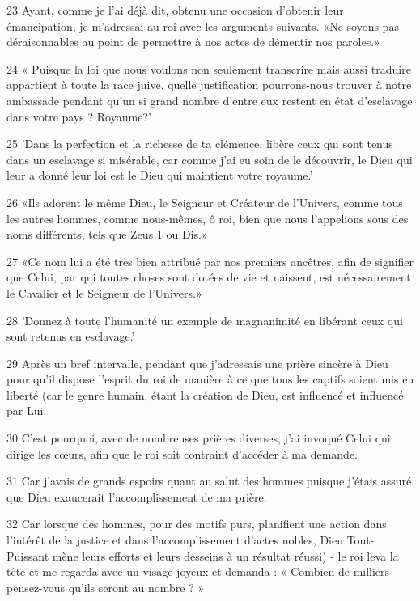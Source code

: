 \par 23 Ayant, comme je l'ai déjà dit, obtenu une occasion d'obtenir leur émancipation, je m'adressai au roi avec les arguments suivants. «Ne soyons pas déraisonnables au point de permettre à nos actes de démentir nos paroles.»

\par 24 « Puisque la loi que nous voulons non seulement transcrire mais aussi traduire appartient à toute la race juive, quelle justification pourrons-nous trouver à notre ambassade pendant qu'un si grand nombre d'entre eux restent en état d'esclavage dans votre pays ? Royaume?'

\par 25 'Dans la perfection et la richesse de ta clémence, libère ceux qui sont tenus dans un esclavage si misérable, car comme j'ai eu soin de le découvrir, le Dieu qui leur a donné leur loi est le Dieu qui maintient votre royaume.'

\par 26 «Ils adorent le même Dieu, le Seigneur et Créateur de l'Univers, comme tous les autres hommes, comme nous-mêmes, ô roi, bien que nous l'appelions sous des noms différents, tels que Zeus 1 ou Dis.»

\par 27 «Ce nom lui a été très bien attribué par nos premiers ancêtres, afin de signifier que Celui, par qui toutes choses sont dotées de vie et naissent, est nécessairement le Cavalier et le Seigneur de l'Univers.»

\par 28 'Donnez à toute l'humanité un exemple de magnanimité en libérant ceux qui sont retenus en esclavage.'

\par 29 Après un bref intervalle, pendant que j'adressais une prière sincère à Dieu pour qu'il dispose l'esprit du roi de manière à ce que tous les captifs soient mis en liberté (car le genre humain, étant la création de Dieu, est influencé et influencé par Lui.

\par 30 C'est pourquoi, avec de nombreuses prières diverses, j'ai invoqué Celui qui dirige les cœurs, afin que le roi soit contraint d'accéder à ma demande.

\par 31 Car j'avais de grands espoirs quant au salut des hommes puisque j'étais assuré que Dieu exaucerait l'accomplissement de ma prière.

\par 32 Car lorsque des hommes, pour des motifs purs, planifient une action dans l'intérêt de la justice et dans l'accomplissement d'actes nobles, Dieu Tout-Puissant mène leurs efforts et leurs desseins à un résultat réussi) - le roi leva la tête et me regarda avec un visage joyeux et demanda : « Combien de milliers pensez-vous qu'ils seront au nombre ? »

